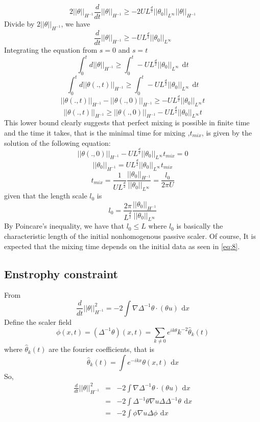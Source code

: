 \documentclass[12pt]{report}   %
\renewcommand{\leq}{\leqslant}
\renewcommand{\geq}{\geqslant}
\numberwithin{equation}{section}
\theoremstyle{plain}
\theoremstyle{definition}
\theoremstyle{remark}
\newcommand{\rmd}{\, \mathrm{d}}
\begin{document}
\[ 2||\theta||_{H^{-1}} \frac{d}{dt}||\theta||_{H^{-1}} \geq -2UL^{\frac{d}{2}} || \theta_0||_{L^\infty} ||\theta||_{H^{-1}} \]
Divide by $2||\theta||_{H^{-1}}$, we have 
\[ \frac{d}{dt}||\theta||_{H^{-1}} \geq - UL^{\frac{d}{2}} || \theta_0||_{L^\infty}  \]
Integrating the equation from $s= 0$ and $s =t$ \\
\[\int_0^t d ||\theta||_{H^{-1}} \geq \int_0^t  - UL^{\frac{d}{2}} || \theta_0||_{L^\infty} ~\rmd t \]
\[\int_0^t d ||\theta(.,t)||_{H^{-1}} \geq \int_0^t  - UL^{\frac{d}{2}} || \theta_0||_{L^\infty} ~\rmd t \] 
\[  ||\theta(.,t)||_{H^{-1}} -  ||\theta(.,0)||_{H^{-1}} \geq  - UL^{\frac{d}{2}} || \theta_0||_{L^\infty} t \]
\begin{equation}
||\theta(.,t)||_{H^{-1}}  \geq  ||\theta(.,0)||_{H^{-1}} - UL^{\frac{d}{2}} || \theta_0||_{L^\infty} t \label{eq:7}
\end{equation}
This lower bound clearly suggests that perfect mixing is possible in finite time and the time it takes, that is the minimal time for mixing ,$t_{mix}$, is given by the solution of the following equation:
 \[  ||\theta(.,0)||_{H^{-1}} - UL^{\frac{d}{2}} || \theta_0||_{L^\infty} t_{mix} = 0 \]
  \[  ||\theta_0||_{H^{-1}} =  UL^{\frac{d}{2}} || \theta_0||_{L^\infty} t_{mix} \]
  \begin{equation}
  t_{mix} = \frac{1}{UL^{\frac{d}{2}}} \frac{ || \theta_0||_{H^{-1}}}{ || \theta_0||_{L^\infty}} = \frac{l_0}{2\pi U} \label{eq:8}
  \end{equation}
  given that the length scale $l_0$ is 
  \begin{equation}
l_0  = \frac{2\pi}{L^\frac{d}{2}} \frac{||\theta_0||_{H^{-1}}}{||\theta_0||_{L^\infty}} \label{eq:9}
    \end{equation}
    By Poincare's inequality, we have that $l_0 \leq L$ where $l_0$ is basically the characteristic length of the initial nonhomogenous passive scaler. Of course, It is expected that the mixing time depends on the initial data as seen in \eqref{eq:8}.
\subsection{Enstrophy constraint}
From 
\[  \frac{d}{dt}||\theta||_{H^{-1}}^2 =  -2 \int  \nabla\Delta^{-1}\theta \cdot(\theta u)  ~\rmd x\]
Define the scaler field
\begin{equation}
\phi(x,t) = (\Delta^{-1}\theta)(x,t) = \sum_{k\neq0} e^{ik\theta}k^{-2}\hat{\theta}_k(t) \label{eq:10}
\end{equation} 
where $ \hat{\theta}_k(t)$ are the fourier coefficients, that is  \[ \hat{\theta}_k(t) = \int e^{-ikx}\theta(x,t) ~\rmd x \]
So,
\begin{eqnarray*}   
 \frac{d}{dt}||\theta||_{H^{-1}}^2 &=& -2 \int  \nabla\Delta^{-1}\theta \cdot(\theta u)  ~\rmd x \\
& = & -2 \int  \Delta^{-1}\theta \nabla u \Delta\Delta^{-1}\theta  ~\rmd x \\
&=  &-2 \int \phi \nabla u \Delta\phi  ~\rmd x \\
\end{eqnarray*}
\end{document}
